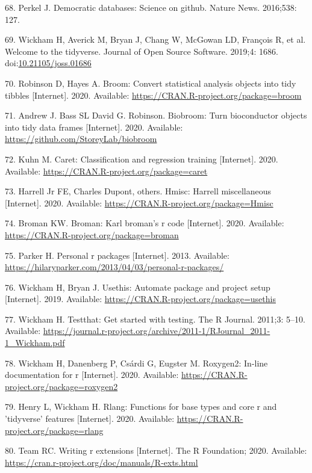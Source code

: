 \documentclass[10pt,letterpaper]{article}
\begin{document}
\leavevmode\hypertarget{ref-perkel2016}{}%
68. Perkel J. Democratic databases: Science on github. Nature News.
2016;538: 127.

\leavevmode\hypertarget{ref-tidyverse}{}%
69. Wickham H, Averick M, Bryan J, Chang W, McGowan LD, François R, et
al. Welcome to the tidyverse. Journal of Open Source Software. 2019;4:
1686.
doi:\href{https://doi.org/10.21105/joss.01686}{10.21105/joss.01686}

\leavevmode\hypertarget{ref-broom}{}%
70. Robinson D, Hayes A. Broom: Convert statistical analysis objects
into tidy tibbles {[}Internet{]}. 2020. Available:
\url{https://CRAN.R-project.org/package=broom}

\leavevmode\hypertarget{ref-biobroom}{}%
71. Andrew J. Bass SL David G. Robinson. Biobroom: Turn bioconductor
objects into tidy data frames {[}Internet{]}. 2020. Available:
\url{https://github.com/StoreyLab/biobroom}

\leavevmode\hypertarget{ref-caret}{}%
72. Kuhn M. Caret: Classification and regression training
{[}Internet{]}. 2020. Available:
\url{https://CRAN.R-project.org/package=caret}

\leavevmode\hypertarget{ref-Hmisc}{}%
73. Harrell Jr FE, Charles Dupont, others. Hmisc: Harrell miscellaneous
{[}Internet{]}. 2020. Available:
\url{https://CRAN.R-project.org/package=Hmisc}

\leavevmode\hypertarget{ref-broman}{}%
74. Broman KW. Broman: Karl broman's r code {[}Internet{]}. 2020.
Available: \url{https://CRAN.R-project.org/package=broman}

\leavevmode\hypertarget{ref-parker2013}{}%
75. Parker H. Personal r packages {[}Internet{]}. 2013. Available:
\url{https://hilaryparker.com/2013/04/03/personal-r-packages/}

\leavevmode\hypertarget{ref-usethis}{}%
76. Wickham H, Bryan J. Usethis: Automate package and project setup
{[}Internet{]}. 2019. Available:
\url{https://CRAN.R-project.org/package=usethis}

\leavevmode\hypertarget{ref-testthat}{}%
77. Wickham H. Testthat: Get started with testing. The R Journal.
2011;3: 5--10. Available:
\url{https://journal.r-project.org/archive/2011-1/RJournal_2011-1_Wickham.pdf}

\leavevmode\hypertarget{ref-roxygen2}{}%
78. Wickham H, Danenberg P, Csárdi G, Eugster M. Roxygen2: In-line
documentation for r {[}Internet{]}. 2020. Available:
\url{https://CRAN.R-project.org/package=roxygen2}

\leavevmode\hypertarget{ref-rlang}{}%
79. Henry L, Wickham H. Rlang: Functions for base types and core r and
'tidyverse' features {[}Internet{]}. 2020. Available:
\url{https://CRAN.R-project.org/package=rlang}

\leavevmode\hypertarget{ref-Rcore2020}{}%
80. Team RC. Writing r extensions {[}Internet{]}. The R Foundation;
2020. Available:
\url{https://cran.r-project.org/doc/manuals/R-exts.html}

\nolinenumbers
\end{document}
